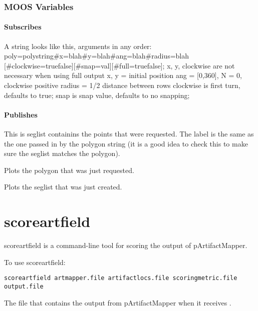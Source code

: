 \subsubsection{MOOS Variables}
\paragraph{Subscribes}
\begin{hangpar}{\pin}{}
A  string looks like this, arguments in any order:
poly=polystring\#x=blah\#y=blah\#ang=blah\#radius=blah [\#clockwise=truefalse][\#snap=val][\#full=truefalse];
x, y, clockwise are not necessary when using full output
x, y = initial position
ang = [0,360], N = 0, clockwise positive
radius = 1/2 distance between rows
clockwise is first turn, defaults to true;
snap is snap value, defaults to no snapping;
\end{hangpar}

\paragraph{Publishes}
\begin{hangpar}{\pin}{}
This is seglist containins the points that were requested.  The label is the same as the one passed in by the polygon string (it is a good idea to check this to make sure the seglist matches the polygon).
\end{hangpar}
\begin{hangpar}{\pin}{}
Plots the polygon that was just requested.
\end{hangpar}
\begin{hangpar}{\pin}{}
Plots the seglist that was just created.
\end{hangpar}


\section{scoreartfield}
\label{app:scoreartfield}
scoreartfield is a command-line tool for scoring the output of pArtifactMapper.

To use scoreartfield:

\scriptsize
{\tt scoreartfield artmapper.file artifactlocs.file scoringmetric.file output.file}
\normalsize

\begin{hangpar}{\pin}{}
The file that contains the output from pArtifactMapper when it receives .
\end{hangpar}

